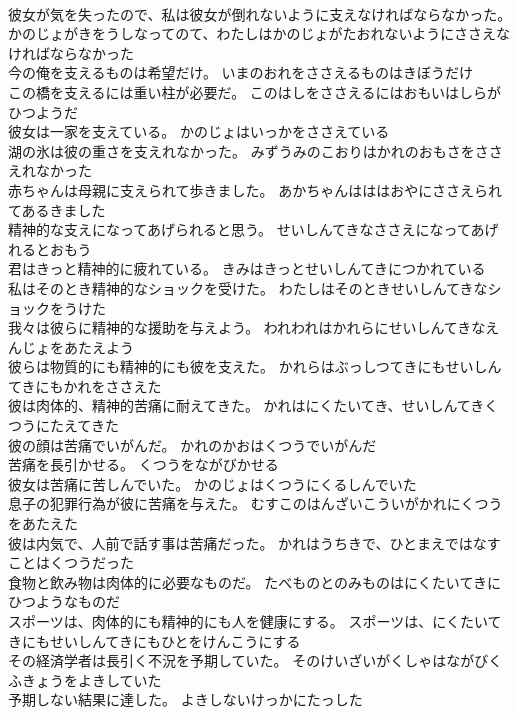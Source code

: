 \documentclass[8pt]{extreport}
\begin{document}
\begin{CJK}{UTF8}{min}
\\	彼女が気を失ったので、私は彼女が倒れないように支えなければならなかった。	かのじょがきをうしなってのて、わたしはかのじょがたおれないようにささえなければならなかった 
\\	今の俺を支えるものは希望だけ。	いまのおれをささえるものはきぼうだけ 
\\	この橋を支えるには重い柱が必要だ。	このはしをささえるにはおもいはしらがひつようだ 
\\	彼女は一家を支えている。	かのじょはいっかをささえている 
\\	湖の氷は彼の重さを支えれなかった。	みずうみのこおりはかれのおもさをささえれなかった 
\\	赤ちゃんは母親に支えられて歩きました。	あかちゃんはははおやにささえられてあるきました 
\\	精神的な支えになってあげられると思う。	せいしんてきなささえになってあげれるとおもう 
\\	君はきっと精神的に疲れている。	きみはきっとせいしんてきにつかれている 
\\	私はそのとき精神的なショックを受けた。	わたしはそのときせいしんてきなショックをうけた 
\\	我々は彼らに精神的な援助を与えよう。	われわれはかれらにせいしんてきなえんじょをあたえよう 
\\	彼らは物質的にも精神的にも彼を支えた。	かれらはぶっしつてきにもせいしんてきにもかれをささえた 
\\	彼は肉体的、精神的苦痛に耐えてきた。	かれはにくたいてき、せいしんてきくつうにたえてきた 
\\	彼の顔は苦痛でいがんだ。	かれのかおはくつうでいがんだ 
\\	苦痛を長引かせる。	くつうをながびかせる 
\\	彼女は苦痛に苦しんでいた。	かのじょはくつうにくるしんでいた 
\\	息子の犯罪行為が彼に苦痛を与えた。	むすこのはんざいこういがかれにくつうをあたえた 
\\	彼は内気で、人前で話す事は苦痛だった。	かれはうちきで、ひとまえではなすことはくつうだった 
\\	食物と飲み物は肉体的に必要なものだ。	たべものとのみものはにくたいてきにひつようなものだ 
\\	スポーツは、肉体的にも精神的にも人を健康にする。	スポーツは、にくたいてきにもせいしんてきにもひとをけんこうにする 
\\	その経済学者は長引く不況を予期していた。	そのけいざいがくしゃはながびくふきょうをよきしていた 
\\	予期しない結果に達した。	よきしないけっかにたっした 

\end{CJK}
\end{document}
